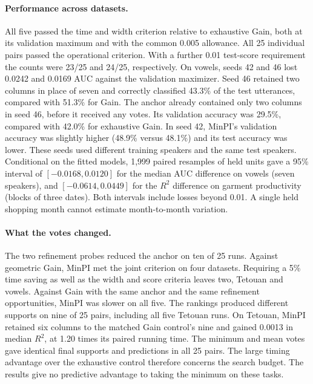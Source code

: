 \paragraph{Performance across datasets.}
All five passed the time and width criterion relative to exhaustive Gain, both at its validation maximum and with the common 0.005 allowance. All 25 individual pairs passed the operational criterion. With a further 0.01 test-score requirement the counts were 23/25 and 24/25, respectively. On vowels, seeds 42 and 46 lost 0.0242 and 0.0169 AUC against the validation maximizer. Seed 46 retained two columns in place of seven and correctly classified 43.3\% of the test utterances, compared with 51.3\% for Gain. The anchor already contained only two columns in seed 46, before it received any votes. Its validation accuracy was 29.5\%, compared with 42.0\% for exhaustive Gain. In seed 42, MinPI's validation accuracy was slightly higher (48.9\% versus 48.1\%) and its test accuracy was lower. These seeds used different training speakers and the same test speakers. Conditional on the fitted models, 1,999 paired resamples of held units gave a 95\% interval of $[-0.0168,0.0120]$ for the median AUC difference on vowels (seven speakers), and $[-0.0614,0.0449]$ for the $R^2$ difference on garment productivity (blocks of three dates). Both intervals include losses beyond 0.01. A single held shopping month cannot estimate month-to-month variation.

\paragraph{What the votes changed.}
The two refinement probes reduced the anchor on ten of 25 runs. Against geometric Gain, MinPI met the joint criterion on four datasets. Requiring a 5\% time saving as well as the width and score criteria leaves two, Tetouan and vowels. Against Gain with the same anchor and the same refinement opportunities, MinPI was slower on all five. The rankings produced different supports on nine of 25 pairs, including all five Tetouan runs. On Tetouan, MinPI retained six columns to the matched Gain control's nine and gained 0.0013 in median $R^2$, at 1.20 times its paired running time. The minimum and mean votes gave identical final supports and predictions in all 25 pairs. The large timing advantage over the exhaustive control therefore concerns the search budget. The results give no predictive advantage to taking the minimum on these tasks.

